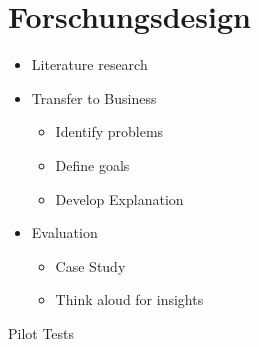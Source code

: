 \section{Forschungsdesign}

\begin{itemize}
    \item Literature research
    \item Transfer to Business
        \begin{itemize}
            \item Identify problems
            \item Define goals
            \item Develop Explanation
        \end{itemize}
    \item Evaluation
        \begin{itemize}
            \item Case Study
            \item Think aloud for insights
        \end{itemize}
\end{itemize}

Pilot Tests